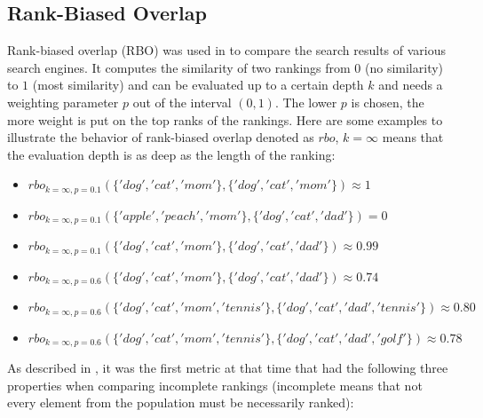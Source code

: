 \documentclass[draft,final]{thesisclass} %
\begin{document}
\subsection{Rank-Biased Overlap}
Rank-biased overlap (RBO) was used in \cite{rank_biased_overlap} to compare the search results of various search engines.
It computes the similarity of two rankings from $0$ (no similarity) to $1$ (most similarity) and can be evaluated up to a certain depth $k$ and needs a weighting parameter $p$ out of the interval $(0,1)$.
The lower $p$ is chosen, the more weight is put on the top ranks of the rankings.
Here are some examples to illustrate the behavior of rank-biased overlap denoted as $rbo$, $k=\infty$ means that the evaluation depth is as deep as the length of the ranking:
\begin{itemize}
    \item $rbo_{k=\infty,p=0.1}(\{'dog','cat','mom'\},\{'dog','cat','mom'\}) \approx 1$
    \item $rbo_{k=\infty,p=0.1}(\{'apple','peach','mom'\},\{'dog','cat','dad'\}) = 0$
    \item $rbo_{k=\infty,p=0.1}(\{'dog','cat','mom'\},\{'dog','cat','dad'\}) \approx 0.99$
    \item $rbo_{k=\infty,p=0.6}(\{'dog','cat','mom'\},\{'dog','cat','dad'\}) \approx 0.74$
    \item $rbo_{k=\infty,p=0.6}(\{'dog','cat','mom','tennis'\},\{'dog','cat','dad','tennis'\}) \approx 0.80$
    \item $rbo_{k=\infty,p=0.6}(\{'dog','cat','mom','tennis'\},\{'dog','cat','dad','golf'\}) \approx 0.78$
\end{itemize}
As described in \cite[1]{rank_biased_overlap}, it was the first metric at that time that had the following three properties when comparing incomplete rankings (incomplete means that not every element from the population must be necessarily ranked):
\end{document}
